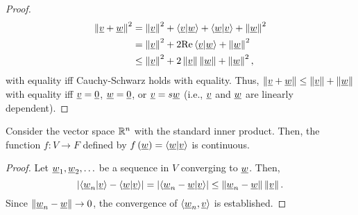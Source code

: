 \begin{proof}
\begin{equation*}
\begin{split}
\left\| \underline{v} + \underline{w} \right\|^2
&= \left\| \underline{v} \right\|^2 + \left\langle \underline{v} | \underline{w} \right\rangle + \left\langle \underline{w} | \underline{v} \right\rangle + \left\| \underline{w} \right\|^2 \\
&= \left\| \underline{v} \right\|^2 + 2 \mathrm{Re} \left\langle \underline{v} | \underline{w} \right\rangle + \left\| \underline{w} \right\|^2 \\
&\leq \left\| \underline{v} \right\|^2 + 2 \left\| \underline{v} \right\| \left\| \underline{w} \right\| + \left\| \underline{w} \right\|^2 ,
\end{split}
\end{equation*}
with equality iff Cauchy-Schwarz holds with equality.
Thus, $\left\| \underline{v} + \underline{w} \right\| \leq \left\| \underline{v} \right\| + \left\| \underline{w} \right\|$ with equality iff $\underline{v} = \underline{0}$, $\underline{w}=\underline{0}$, or $\underline{v} = s \underline{w}$ (i.e., $\underline{v}$ and $\underline{w}$ are linearly dependent).
\end{proof}


\begin{theorem}
\label{theorem:InnerProductContinuous}
Consider the vector space $\mathbb{R}^n$ with the standard inner product. %
Then, the function $f \colon V \rightarrow F$ defined by $f \left( \underline{w} \right) = \left\langle \underline{w} | \underline{v} \right\rangle$ is continuous.
\end{theorem}
\begin{proof}
Let $\underline{w}_1, \underline{w}_2, \ldots$ be a sequence in $V$ converging to $\underline{w}$.
Then,
\begin{equation*}
\left| \left\langle \underline{w}_n | \underline{v} \right\rangle
- \left\langle \underline{w} | \underline{v} \right\rangle \right|
= \left| \left\langle \underline{w}_n - \underline{w} | \underline{v} \right\rangle \right|
\leq \left\| \underline{w}_n - \underline{w} \right\| \left\| \underline{v} \right\|.
\end{equation*}
Since $\left\| \underline{w}_n - \underline{w} \right\| \rightarrow 0$, the convergence of $\left\langle \underline{w}_n, \underline{v} \right\rangle$ is established.
\end{proof}


